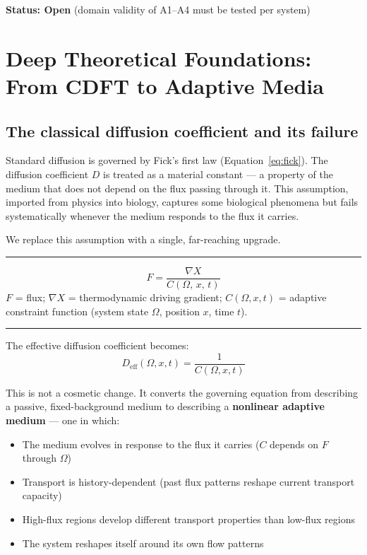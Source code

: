 \documentclass[11pt]{article}
\newcommand{\Om}{\Omega}
\newenvironment{cdftbox}{\begin{center}\begin{minipage}{0.95\linewidth}\hrule\vspace{0.5em}}{\vspace{0.5em}\hrule\end{minipage}\end{center}}
\begin{document}
\textbf{Status: Open} (domain validity of A1--A4 must be tested per system)


\section{Deep Theoretical Foundations: From CDFT to Adaptive Media}
\subsection{The classical diffusion coefficient and its failure}

Standard diffusion is governed by Fick's first law (Equation~\ref{eq:fick}). The diffusion coefficient $D$ is treated as a material constant --- a property of the medium that does not depend on the flux passing through it. This assumption, imported from physics into biology, captures some biological phenomena but fails systematically whenever the medium responds to the flux it carries.

We replace this assumption with a single, far-reaching upgrade.

\begin{cdftbox}
\begin{equation}
F = \frac{\nabla X}{C(\Om,\, x,\, t)}
\label{eq:cdft}
\end{equation}
\vspace{-4pt}
{\small $F$ = flux; $\nabla X$ = thermodynamic driving gradient; $C(\Om,x,t)$ = adaptive constraint function (system state $\Om$, position $x$, time $t$).}
\end{cdftbox}

\vspace{4pt}
The effective diffusion coefficient becomes:
\begin{equation}
D_{\mathrm{eff}}(\Om,x,t) = \frac{1}{C(\Om,x,t)}
\label{eq:D_adaptive}
\end{equation}

This is not a cosmetic change. It converts the governing equation from describing a passive, fixed-background medium to describing a \textbf{nonlinear adaptive medium} --- one in which:
\begin{itemize}[leftmargin=1.5em,itemsep=3pt]
\item The medium evolves in response to the flux it carries ($C$ depends on $F$ through $\Om$)
\item Transport is history-dependent (past flux patterns reshape current transport capacity)
\item High-flux regions develop different transport properties than low-flux regions
\item The system reshapes itself around its own flow patterns
\end{itemize}
\end{document}
